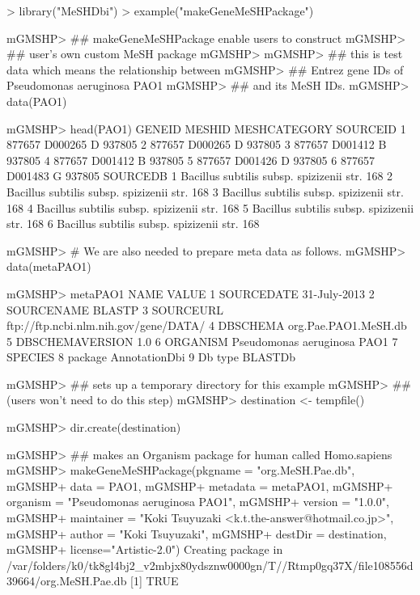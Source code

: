 \documentclass[11pt]{article}
\begin{document}
\begin{center}
\begin{Schunk}
\begin{Sinput}
> library("MeSHDbi")
> example("makeGeneMeSHPackage")
\end{Sinput}
\begin{Soutput}
mGMSHP> ## makeGeneMeSHPackage enable users to construct
mGMSHP> ## user's own custom MeSH package
mGMSHP> 
mGMSHP> ## this is test data which means the relationship between
mGMSHP> ## Entrez gene IDs of Pseudomonas aeruginosa PAO1
mGMSHP> ## and its MeSH IDs.
mGMSHP> data(PAO1)

mGMSHP> head(PAO1)
  GENEID  MESHID MESHCATEGORY SOURCEID
1 877657 D000265            D   937805
2 877657 D000265            D   937805
3 877657 D001412            B   937805
4 877657 D001412            B   937805
5 877657 D001426            D   937805
6 877657 D001483            G   937805
                                      SOURCEDB
1 Bacillus subtilis subsp. spizizenii str. 168
2 Bacillus subtilis subsp. spizizenii str. 168
3 Bacillus subtilis subsp. spizizenii str. 168
4 Bacillus subtilis subsp. spizizenii str. 168
5 Bacillus subtilis subsp. spizizenii str. 168
6 Bacillus subtilis subsp. spizizenii str. 168

mGMSHP> # We are also needed to prepare meta data as follows.
mGMSHP> data(metaPAO1)

mGMSHP> metaPAO1
             NAME                                 VALUE
1      SOURCEDATE                          31-July-2013
2      SOURCENAME                                BLASTP
3       SOURCEURL ftp://ftp.ncbi.nlm.nih.gov/gene/DATA/
4        DBSCHEMA                  org.Pae.PAO1.MeSH.db
5 DBSCHEMAVERSION                                   1.0
6        ORGANISM           Pseudomonas aeruginosa PAO1
7         SPECIES                                      
8         package                         AnnotationDbi
9         Db type                               BLASTDb

mGMSHP> ## sets up a temporary directory for this example
mGMSHP> ## (users won't need to do this step)
mGMSHP> destination <- tempfile()

mGMSHP> dir.create(destination)

mGMSHP> ## makes an Organism package for human called Homo.sapiens
mGMSHP> makeGeneMeSHPackage(pkgname = "org.MeSH.Pae.db",
mGMSHP+ 					data = PAO1,
mGMSHP+           metadata = metaPAO1,
mGMSHP+ 					organism = "Pseudomonas aeruginosa PAO1",
mGMSHP+ 					version = "1.0.0",
mGMSHP+ 					maintainer = "Koki Tsuyuzaki <k.t.the-answer@hotmail.co.jp>",
mGMSHP+ 					author = "Koki Tsuyuzaki",
mGMSHP+ 					destDir = destination,
mGMSHP+ 					license="Artistic-2.0")
Creating package in /var/folders/k0/tk8gl4bj2_v2mbjx80ydsznw0000gn/T//Rtmp0gq37X/file108556d39664/org.MeSH.Pae.db 
[1] TRUE
\end{Soutput}
\end{Schunk}
\end{center}
\end{document}
